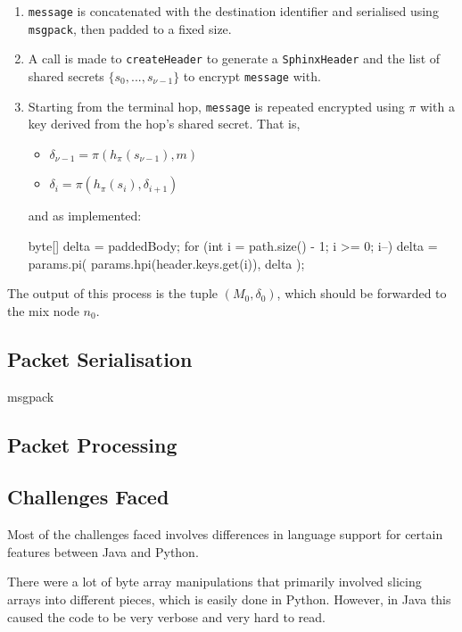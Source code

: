 \documentclass[12pt,a4paper,twoside,openright]{report}
\begin{document}
\begin{enumerate}
	\item \verb|message| is concatenated with the destination identifier and serialised using \verb|msgpack|, then padded to a fixed size.
	\item A call is made to \verb|createHeader| to generate a \verb|SphinxHeader| and the list of shared secrets $\{s_0,...,s_{\nu-1}\}$ to encrypt \verb|message| with.
	\item Starting from the terminal hop, \verb|message| is repeated encrypted using $\pi$ with a key derived from the hop's shared secret. That is,
		\begin{itemize}
			\setlength\itemsep{-0em}
			\item $\delta_{\nu-1} = \pi(h_\pi(s_{\nu-1}), m)$
			\item $\delta_i = \pi(h_\pi(s_{i}), \delta_{i+1})$
		\end{itemize}
	and as implemented:
	\begin{javacode}
byte[] delta = paddedBody;
for (int i = path.size() - 1; i >= 0; i--) {
	delta = params.pi(
		params.hpi(header.keys.get(i)), 
		delta
	);
}
	\end{javacode}
\end{enumerate}

The output of this process is the tuple $(M_0, \delta_0)$, which should be forwarded to the mix node $n_0$.

\subsection{Packet Serialisation}

msgpack

\subsection{Packet Processing}

\subsection{Challenges Faced}

Most of the challenges faced involves differences in language support for certain features between Java and Python.

There were a lot of byte array manipulations that primarily involved slicing arrays into different pieces, which is easily done in Python. However, in Java this caused the code to be very verbose and very hard to read.
\end{document}
